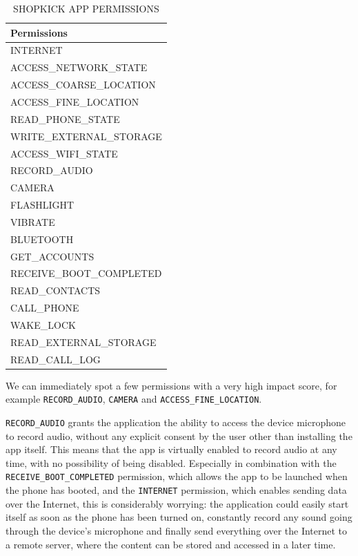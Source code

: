\begin{table}[ht]
    \caption{SHOPKICK APP PERMISSIONS}
    \label{tab:shopkick-permissions}
    \centering
    \begin{tabular}{l}
        \toprule
            Permissions \\
            \midrule
                INTERNET \\
                ACCESS\_NETWORK\_STATE \\
                ACCESS\_COARSE\_LOCATION \\
                ACCESS\_FINE\_LOCATION \\
                READ\_PHONE\_STATE \\
                WRITE\_EXTERNAL\_STORAGE \\
                ACCESS\_WIFI\_STATE \\
                RECORD\_AUDIO \\
                CAMERA \\
                FLASHLIGHT \\
                VIBRATE \\
                BLUETOOTH \\
                GET\_ACCOUNTS \\
                RECEIVE\_BOOT\_COMPLETED \\
                READ\_CONTACTS \\
                CALL\_PHONE \\
                WAKE\_LOCK \\
                READ\_EXTERNAL\_STORAGE \\
                READ\_CALL\_LOG \\
        \bottomrule
    \end{tabular}
\end{table}

We can immediately spot a few permissions with a very high impact score, for example \texttt{RECORD\_AUDIO}, \texttt{CAMERA} and \texttt{ACCESS\_FINE\_LOCATION}.

\texttt{RECORD\_AUDIO} grants the application the ability to access the device microphone to record audio, without any explicit consent by the user other than installing the app itself. This means that the app is virtually enabled to record audio at any time, with no possibility of being disabled. Especially in combination with the \texttt{RECEIVE\_BOOT\_COMPLETED} permission, which allows the app to be launched when the phone has booted, and the \texttt{INTERNET} permission, which enables sending data over the Internet, this is considerably worrying: the application could easily start itself as soon as the phone has been turned on, constantly record any sound going through the device's microphone and finally send everything over the Internet to a remote server, where the content can be stored and accessed in a later time.

